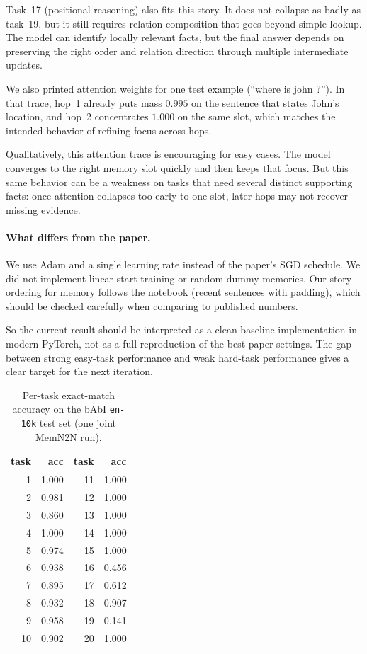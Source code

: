 \documentclass{article}
\begin{document}
Task~17 (positional reasoning) also fits this story. It does not collapse as badly as task~19, but it still requires relation composition that goes beyond simple lookup. The model can identify locally relevant facts, but the final answer depends on preserving the right order and relation direction through multiple intermediate updates.

We also printed attention weights for one test example (``where is john ?''). In that trace, hop~1 already puts mass $0.995$ on the sentence that states John's location, and hop~2 concentrates $1.000$ on the same slot, which matches the intended behavior of refining focus across hops.

Qualitatively, this attention trace is encouraging for easy cases. The model converges to the right memory slot quickly and then keeps that focus. But this same behavior can be a weakness on tasks that need several distinct supporting facts: once attention collapses too early to one slot, later hops may not recover missing evidence.

\paragraph{What differs from the paper.}
We use Adam and a single learning rate instead of the paper's SGD schedule. We did not implement linear start training or random dummy memories. Our story ordering for memory follows the notebook (recent sentences with padding), which should be checked carefully when comparing to published numbers.

So the current result should be interpreted as a clean baseline implementation in modern PyTorch, not as a full reproduction of the best paper settings. The gap between strong easy-task performance and weak hard-task performance gives a clear target for the next iteration.

\begin{table}[t]
\caption{Per-task exact-match accuracy on the bAbI \texttt{en-10k} test set (one joint MemN2N run).}
\label{tab:per_task}
\begin{center}
\begin{tabular}{r|r||r|r}
task & acc & task & acc \\ \hline
1 & 1.000 & 11 & 1.000 \\
2 & 0.981 & 12 & 1.000 \\
3 & 0.860 & 13 & 1.000 \\
4 & 1.000 & 14 & 1.000 \\
5 & 0.974 & 15 & 1.000 \\
6 & 0.938 & 16 & 0.456 \\
7 & 0.895 & 17 & 0.612 \\
8 & 0.932 & 18 & 0.907 \\
9 & 0.958 & 19 & 0.141 \\
10 & 0.902 & 20 & 1.000 \\
\end{tabular}
\end{center}
\end{table}
\end{document}
